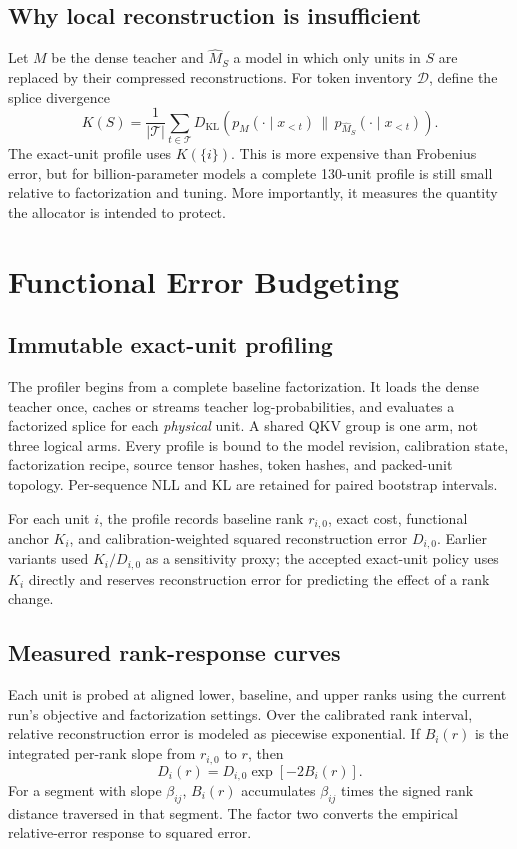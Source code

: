 \documentclass[10pt]{article}
\begin{document}
\subsection{Why local reconstruction is insufficient}

Let $M$ be the dense teacher and $\widehat M_S$ a model in which only units in
$S$ are replaced by their compressed reconstructions. For token inventory
$\mathcal D$, define the splice divergence
\[
 K(S)=\frac{1}{|\mathcal T|}\sum_{t\in\mathcal T}
 D_{\mathrm{KL}}\!\left(p_M(\cdot\mid x_{<t})\,\|\,
 p_{\widehat M_S}(\cdot\mid x_{<t})\right).
 \tag{3}
\]
The exact-unit profile uses $K(\{i\})$. This is more expensive than Frobenius
error, but for billion-parameter models a complete 130-unit profile is still
small relative to factorization and tuning. More importantly, it measures the
quantity the allocator is intended to protect.

\section{Functional Error Budgeting}

\subsection{Immutable exact-unit profiling}

The profiler begins from a complete baseline factorization. It loads the dense
teacher once, caches or streams teacher log-probabilities, and evaluates a
factorized splice for each \emph{physical} unit. A shared QKV group is one arm,
not three logical arms. Every profile is bound to the model revision,
calibration state, factorization recipe, source tensor hashes, token hashes,
and packed-unit topology. Per-sequence NLL and KL are retained for paired
bootstrap intervals.

For each unit $i$, the profile records baseline rank $r_{i,0}$, exact cost,
functional anchor $K_i$, and calibration-weighted squared reconstruction
error $D_{i,0}$. Earlier variants used $K_i/D_{i,0}$ as a sensitivity proxy;
the accepted exact-unit policy uses $K_i$ directly and reserves
reconstruction error for predicting the effect of a rank change.

\subsection{Measured rank-response curves}

Each unit is probed at aligned lower, baseline, and upper ranks using the
current run's objective and factorization settings. Over the calibrated rank
interval, relative reconstruction error is modeled as piecewise exponential.
If $B_i(r)$ is the integrated per-rank slope from $r_{i,0}$ to $r$, then
\[
 D_i(r)=D_{i,0}\exp[-2B_i(r)].
 \tag{4}
\]
For a segment with slope $\beta_{ij}$,
$B_i(r)$ accumulates $\beta_{ij}$ times the signed rank distance traversed in
that segment. The factor two converts the empirical relative-error response to
squared error.
\end{document}
